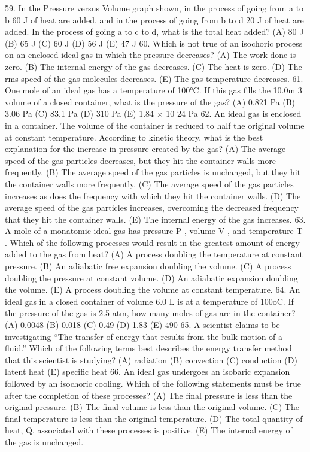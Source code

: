 59. In the Pressure versus Volume graph shown, in the process of going from a to b 60 J of heat are added, and in
the process of going from b to d 20 J of heat are added. In the process of going a to c to d, what is the total heat
added?
(A) 80 J (B) 65 J (C) 60 J (D) 56 J (E) 47 J
60. Which is not true of an isochoric process on an enclosed ideal gas in which the pressure decreases?
(A) The work done is zero. (B) The internal energy of the gas decreases. (C) The heat is zero.
(D) The rms speed of the gas molecules decreases. (E) The gas temperature decreases.
61. One mole of an ideal gas has a temperature of 100°C. If this gas fills the 10.0m 3 volume of a closed container,
what is the pressure of the gas?
(A) 0.821 Pa (B) 3.06 Pa (C) 83.1 Pa (D) 310 Pa (E) 1.84 × 10 24 Pa
62. An ideal gas is enclosed in a container. The volume of the container is reduced to half the original volume at
constant temperature. According to kinetic theory, what is the best explanation for the increase in pressure
created by the gas?
(A) The average speed of the gas particles decreases, but they hit the container walls more frequently.
(B) The average speed of the gas particles is unchanged, but they hit the container walls more frequently.
(C) The average speed of the gas particles increases as does the frequency with which they hit the container
walls.
(D) The average speed of the gas particles increases, overcoming the decreased frequency that they hit the
container walls.
(E) The internal energy of the gas increases.
63. A mole of a monatomic ideal gas has pressure P , volume V , and temperature T . Which of the following
processes would result in the greatest amount of energy added to the gas from heat?
(A) A process doubling the temperature at constant pressure.
(B) An adiabatic free expansion doubling the volume.
(C) A process doubling the pressure at constant volume.
(D) An adiabatic expansion doubling the volume.
(E) A process doubling the volume at constant temperature.
64. An ideal gas in a closed container of volume 6.0 L is at a temperature of 100oC. If the pressure of the gas is 2.5
atm, how many moles of gas are in the container?
(A) 0.0048 (B) 0.018 (C) 0.49 (D) 1.83 (E) 490
65. A scientist claims to be investigating “The transfer of energy that results from the bulk motion of a fluid.”
Which of the following terms best describes the energy transfer method that this scientist is studying?
(A) radiation (B) convection (C) conduction (D) latent heat (E) specific heat
66. An ideal gas undergoes an isobaric expansion followed by an isochoric cooling. Which of the following
statements must be true after the completion of these processes?
(A) The final pressure is less than the original pressure.
(B) The final volume is less than the original volume.
(C) The final temperature is less than the original temperature.
(D) The total quantity of heat, Q, associated with these processes is positive.
(E) The internal energy of the gas is unchanged.



